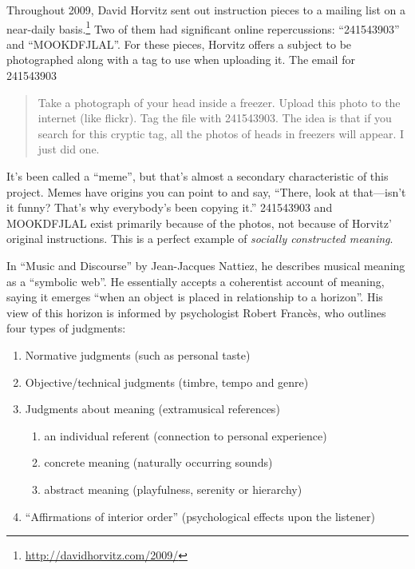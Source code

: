 \documentclass{thesis}
\begin{document}
	Throughout 2009, David Horvitz sent out instruction pieces to a mailing list on a near-daily basis.\footnote{\url{http://davidhorvitz.com/2009/}} Two of them had significant online repercussions: ``241543903''\cite{david_horvitz_flickr:_????-1} and ``MOOKDFJLAL''\cite{david_horvitz_flickr:_????}. For these pieces, Horvitz offers a subject to be photographed along with a tag to use when uploading it. The email for 241543903
	
	\begin{quote}
	Take a photograph of your head inside a freezer. Upload this photo to the internet (like flickr). Tag the file with 241543903. The idea is that if you search for this cryptic tag, all the photos of heads in freezers will appear. I just did one.
	\end{quote}
	
	It's been called a ``meme'', but that's almost a secondary characteristic of this project. Memes have origins you can point to and say, ``There, look at that---isn't it funny? That's why everybody's been copying it.'' 241543903 and MOOKDFJLAL exist primarily because of the photos, not because of Horvitz' original instructions. This is a perfect example of \emph{socially constructed meaning}.
			
	In ``Music and Discourse'' by Jean-Jacques Nattiez\cite{nattiez_music_1990}, he describes musical meaning as a ``symbolic web''. He essentially accepts a coherentist account of meaning, saying it emerges ``when an object is placed in relationship to a horizon''. His view of this horizon is informed by psychologist Robert Franc\`es, who outlines four types of judgments:
	
\begin{enumerate}
	\item Normative judgments (such as personal taste)
	\item Objective/technical judgments (timbre, tempo and genre)
	\item Judgments about meaning (extramusical references)
		\begin{enumerate}
			\item an individual referent (connection to personal experience)
			\item concrete meaning (naturally occurring sounds)
			\item abstract meaning (playfulness, serenity or hierarchy)
		\end{enumerate}
	\item ``Affirmations of interior order'' (psychological effects upon the listener)
\end{enumerate}
\end{document}

